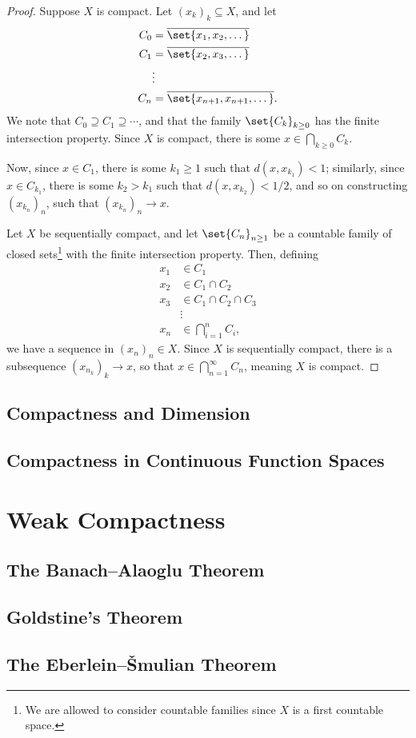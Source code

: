 \documentclass[10pt]{mypackage}
\begin{document}
\begin{proof}
  Suppose $X$ is compact. Let $\left( x_k \right)_{k}\subseteq X$, and let
  \begin{align*}
    C_0 &= \overline{\set{x_1,x_2,\dots}}\\
    C_1 &= \overline{\set{x_2,x_3,\dots}}\\
        &\vdots\\
    C_n &= \overline{\set{x_{n+1},x_{n+1},\dots}}.
  \end{align*}
  We note that $C_0\supseteq C_1\supseteq \cdots$, and that the family $\set{C_k}_{k\geq 0}$ has the finite intersection property. Since $X$ is compact, there is some $x\in \bigcap_{k\geq 0}C_k$.\newline

  Now, since $x\in C_1$, there is some $k_1 \geq 1$ such that $d\left( x,x_{k_1} \right) < 1$; similarly, since $x\in C_{k_1}$, there is some $k_2 > k_1$ such that $d\left( x,x_{k_2} \right) < 1/2$, and so on constructing $\left( x_{k_n} \right)_{n}$, such that $\left( x_{k_n} \right)_n\rightarrow x$.\newline

  Let $X$ be sequentially compact, and let $\set{C_n}_{n\geq 1}$ be a countable family of closed sets\footnote{We are allowed to consider countable families since $X$ is a first countable space.} with the finite intersection property. Then, defining
  \begin{align*}
    x_1 &\in C_1\\
    x_2 &\in C_1\cap C_2\\
    x_3 &\in C_1\cap C_2\cap C_3\\
        &\vdots\\
    x_n &\in \bigcap_{i=1}^{n}C_i,
  \end{align*}
  we have a sequence in $\left( x_n \right)_n\in X$. Since $X$ is sequentially compact, there is a subsequence $\left( x_{n_k} \right)_{k}\rightarrow x$, so that $x \in \bigcap_{n=1}^{\infty}C_n$, meaning $X$ is compact.
\end{proof}

\subsection{Compactness and Dimension}%
\subsection{Compactness in Continuous Function Spaces}%
\section{Weak Compactness}%
\subsection{The Banach--Alaoglu Theorem}%
\subsection{Goldstine's Theorem}%
\subsection{The Eberlein--\v{S}mulian Theorem}%
\end{document}

